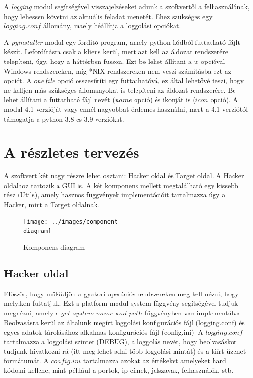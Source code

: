 \documentclass[12pt,a4paper,oneside]{report}
\begin{document}
A \emph{logging} modul segítségével visszajelzéseket adunk a szoftvertől a felhasználónak, hogy lehessen követni az aktuális feladat menetét. Ehez szükséges egy $logging.conf$ állomány, maely béállítja a loggolási opciókat.

A \emph{pyinstaller} modul egy fordító program, amely python kódból futtatható fájlt készít. Lefordításra csak a kliens kerül, mert azt kell az áldozat rendszerére telepíteni, úgy, hogy a háttérben fusson. Ezt be lehet állítani a $w$ opcióval Windows rendszereken, míg *NIX rendszereken nem veszi számításba ezt az opciót. A $onefile$ opció összesűríti egy futtathatóvá, ez által lehetővé teszi, hogy ne kelljen más szükséges állományokat is telepíteni az áldozat rendszerére. Be lehet állítani a futtatható fájl nevét ($name$ opció) és ikonját is ($icon$ opció). A modul 4.1 verzióját vagy ennél nagyobbat érdemes használni, mert a 4.1 verziótól támogatja a python 3.8 és 3.9 verziókat.



\chapter{A részletes tervezés}\label{sec:plan}
A szoftvert két nagy részre lehet osztani: Hacker oldal és Target oldal. A Hacker oldalhoz tartozik a GUI is. A két komponens mellett megtalálható egy kissebb rész (Utils), amely hasznos függvények implementációit tartalmazza úgy a Hacker, mint a Target oldalnak.
\begin{figure}[H]
\centering
\texttt{[image: ../images/component\\ diagram]}
\caption{Komponens diagram}
\label{fig:compdia}
\end{figure}

\section{Hacker oldal}\label{subsec:server}
Előszőr, hogy működjön a gyakori operációs rendszereken meg kell nézni, hogy melyiken futtatjuk. Ezt a platform modul system függvény segítségével tudjuk megnézni, amely a $get\_system\_name\_and\_path$ függvényben van implementálva. Beolvasásra kerül az általunk megírt loggolási konfigurációs fájl (logging.conf) és egyes adatok tárolásához alkalmas konfigurációs fájl (config.ini). A $logging.conf$ tartalmazza a loggolási szintet (DEBUG), a loggolás nevét, hogy beolvasáskor tudjunk hivatkozni rá (itt meg lehet adni több loggolási mintát) és a kiírt üzenet formátumát. A $config.ini$ tartalmazza azokat az értékeket amelyeket hard kódolni kellene, mint például a portok, ip címek, jelszavak, felhasználók, stb.
\end{document}
